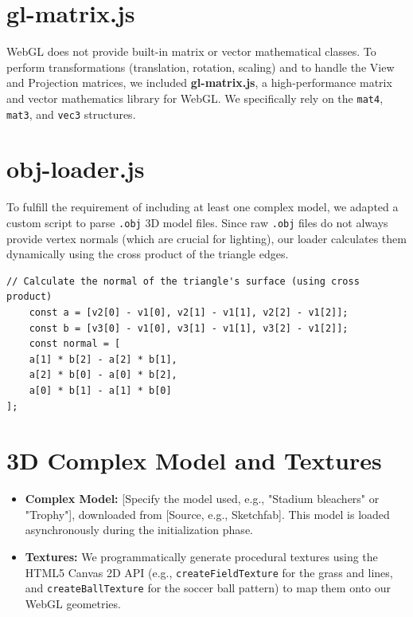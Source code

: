 \documentclass[10pt]{book}
\begin{document}
\section{gl-matrix.js}
WebGL does not provide built-in matrix or vector mathematical classes. To perform transformations (translation, rotation, scaling) and to handle the View and Projection matrices, we included \textbf{gl-matrix.js}, a high-performance matrix and vector mathematics library for WebGL. We specifically rely on the \texttt{mat4}, \texttt{mat3}, and \texttt{vec3} structures.

\section{obj-loader.js}
To fulfill the requirement of including at least one complex model, we adapted a custom script to parse \texttt{.obj} 3D model files. Since raw \texttt{.obj} files do not always provide vertex normals (which are crucial for lighting), our loader calculates them dynamically using the cross product of the triangle edges.

\begin{lstlisting}[style=vscode_C, caption=Procedural Walking Animation Math]
    // Calculate the normal of the triangle's surface (using cross product)
    const a = [v2[0] - v1[0], v2[1] - v1[1], v2[2] - v1[2]];
    const b = [v3[0] - v1[0], v3[1] - v1[1], v3[2] - v1[2]];
    const normal = [
    a[1] * b[2] - a[2] * b[1],
    a[2] * b[0] - a[0] * b[2],
    a[0] * b[1] - a[1] * b[0]
];
\end{lstlisting}

\section{3D Complex Model and Textures}
\begin{itemize}
    \item \textbf{Complex Model:} [Specify the model used, e.g., "Stadium bleachers" or "Trophy"], downloaded from [Source, e.g., Sketchfab]. This model is loaded asynchronously during the initialization phase.
    \item \textbf{Textures:} We programmatically generate procedural textures using the HTML5 Canvas 2D API (e.g., \texttt{createFieldTexture} for the grass and lines, and \texttt{createBallTexture} for the soccer ball pattern) to map them onto our WebGL geometries.
\end{itemize}
\end{document}
